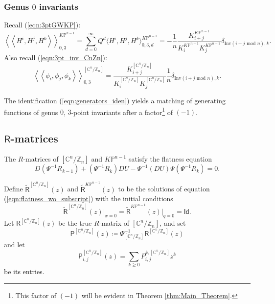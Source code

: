 \documentclass[12pt]{amsart}
\numberwithin{equation}{section}
\newcommand{\CnZn}{[\mathbb{C}^n/\mathbb{Z}_n]}
\newcommand{\KP}{K\mathbb{P}}
\begin{document}


\subsubsection{Genus \texorpdfstring{$0$}{0} invariants}\label{sec:genus0_iden}
Recall (\ref{eqn:3ptGWKP}):
\begin{equation*}
\left\langle\left\langle H^i,H^j,H^k\right\rangle\right\rangle_{0,3}^{\KP^{n-1}}=\sum_{d=0}^{\infty}Q^d\langle H^i, H^j, H^k\rangle_{0,3,d}^{\KP^{n-1}}
=-\frac{1}{n}\frac{K^{\KP^{n-1}}_{i+j}}{K^{\KP^{n-1}}_{i}K^{\KP^{n-1}}_{j}}\delta_{\text{Inv}(i+j \text{ mod }n), k}.
\end{equation*}
Also recall (\ref{eqn:3pt_inv_CnZn}):
\begin{equation*}
\left\langle\left\langle\phi_i,\phi_j,\phi_k\right\rangle\right\rangle_{0,3}^{\CnZn}=\frac{K^{\CnZn}_{i+j}}{K^{\CnZn}_iK^{\CnZn}_j}\frac{1}{n}\delta_{\text{Inv}(i+j \text{ mod }n), k}. \end{equation*}

The identification (\ref{eqn:generators_iden}) yields a matching of generating functions of genus $0$, $3$-point invariants after a factor\footnote{This factor of $(-1)$ will be evident in Theorem \ref{thm:Main_Theorem}.} of $(-1)$.


\subsection{\texorpdfstring{$\mathsf{R}$}{R}-matrices}\label{sec:R_iden}
The $R$-matrices of $\CnZn$ and $\KP^{n-1}$ satisfy the flatness equation
\begin{equation}\label{eqn:flatness_wo_subscript}
D\left(\Psi^{-1}R_{k-1}\right)+\left(\Psi^{-1}R_k\right)DU-\Psi^{-1}\left(DU\right)\Psi\left(\Psi^{-1}R_k\right)=0.   
\end{equation}

Define $\widetilde{\mathsf{R}}^{\CnZn}(z)$ and $\widetilde{\mathsf{R}}^{\KP^{n-1}}(z)$ to be the solutions of equation (\ref{eqn:flatness_wo_subscript}) with the initial conditions
\begin{equation*}
\widetilde{\mathsf{R}}^{\CnZn}(z)\big\vert_{x=0}=\widetilde{\mathsf{R}}^{\KP^{n-1}}(z)\big\vert_{q=0}=\mathsf{Id}.
\end{equation*}
Let ${\mathsf{R}}^{\CnZn}(z)$ be the true $R$-matrix of $\CnZn$, and set $$\mathsf{P}^{\CnZn}(z) \coloneqq \Psi^{-1}_{\CnZn}{\mathsf{R}}^{\CnZn}(z)$$
and let $$\mathsf{P}_{i,j}^{\CnZn}(z)=\sum_{k\geq{0}}P_{i,j}^{k,\CnZn}z^k$$
be its entries.
\end{document}
